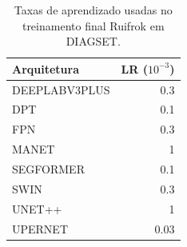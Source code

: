 \begin{table}[!htb]
\centering
\caption{Taxas de aprendizado usadas no treinamento final Ruifrok em DIAGSET.}
\label{tab:results_diagset-learning-rates-ruifrok}
\begin{minipage}[t]{0.52\textwidth}
\centering
\vspace{0pt}
\end{minipage}\hfill
\begin{minipage}[t]{0.40\textwidth}
\centering
\vspace{0pt}
\small
\begin{tabular}{lr}
\toprule
Arquitetura & LR ($10^{-3}$) \\
\midrule
DEEPLABV3PLUS & 0.3 \\
DPT & 0.1 \\
FPN & 0.3 \\
MANET & 1 \\
SEGFORMER & 0.1 \\
SWIN & 0.3 \\
UNET++ & 1 \\
UPERNET & 0.03 \\
\bottomrule
\end{tabular}
\end{minipage}
\end{table}
